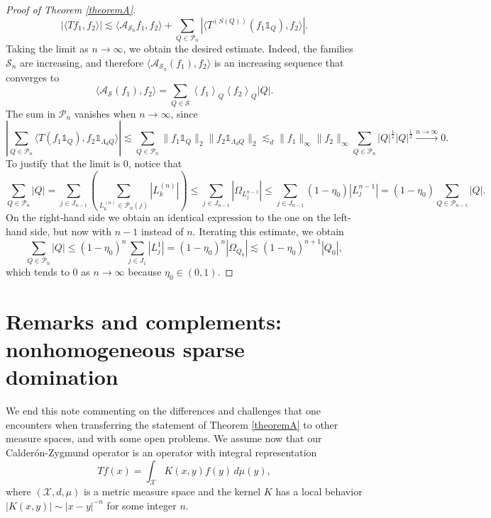 \documentclass[12pt]{amsart}
\newcommand{\one}{\mathds{1}}
\newcommand{\Ss}{\mathcal{S}}
\theoremstyle{plain}
\theoremstyle{definition} %
\numberwithin{equation}{section}
\begin{document}
\begin{proof}[Proof of Theorem \ref{theoremA}]
    \[
    |\langle Tf_1,f_2\rangle|
    \lesssim 
    \langle \mathcal{A}_{\Ss_n}f_1,f_2\rangle 
    +
    \sum_{Q\in \mathcal{P}_n}|\langle T^{(S(Q))}(f_1\one_{Q}),f_2\rangle|.
    \]
    Taking the limit as $n\to\infty$, we obtain the desired estimate. Indeed, the families $\Ss_n$ are increasing, and therefore $\langle \mathcal{A}_{\Ss_n}(f_1),f_2\rangle$ is an increasing sequence that converges to 
    \[
    \langle \mathcal{A}_{\Ss}(f_1),f_2\rangle
    =
    \sum_{Q \in \Ss}\left\langle f_1\right\rangle_Q\left\langle f_2\right\rangle_Q|Q|.
    \]
    The sum in $\mathcal{P}_n$ vanishes when $n\to\infty$, since%
    \[
    \left|\sum_{Q\in\mathcal{P}_n}\langle T(f_1\one_Q),f_2\one_{\Lambda_d Q}\rangle \right|
    \lesssim %
    \sum_{Q\in\mathcal{P}_n}\|f_1\one_{Q}\|_2\|f_2\one_{\Lambda_d Q}\|_{2}
    \lesssim_{d}
    \|f_1\|_{\infty}\|f_2\|_{\infty}\sum_{Q\in\mathcal{P}_n}|Q|^{\frac{1}{2}}|Q|^{\frac{1}{2}}
    \xrightarrow{n\to\infty}
    0.
    \]
    To justify that the limit is $0$, notice that
    \[
    \sum_{Q\in\mathcal{P}_n}|Q|
    =
    \sum_{j\in J_{n-1}}
    \left(
    \sum_{L_{k}^{(n)}\in \mathcal{P}_n(j)}
    |L_k^{(n)}|
    \right)
    \leq %
    \sum_{j\in J_{n-1}}
    |\Omega_{L_j^{n-1}}|
    \leq 
    \sum_{j\in J_{n-1}}(1-\eta_0)|L_j^{n-1}|
    =
    (1-\eta_0)\sum_{Q\in\mathcal{P}_{n-1}}|Q|.
    \]
    On the right-hand side we obtain an identical expression to the one on the left-hand side, but now with $n-1$ instead of $n$. Iterating this estimate, we obtain
    \[
    \sum_{Q\in\mathcal{P}_n}|Q|
    \leq 
    (1-\eta_0)^n\sum_{j\in J_1}|L_j^{1}|
    =
    (1-\eta_0)^n|\Omega_{Q_0}|
    \lesssim
    (1-\eta_0)^{n+1}|Q_0|,
    \]
    which tends to $0$ as $n\to\infty$ because $\eta_0\in (0,1)$.  \qedhere    
\end{proof}

\section{Remarks and complements: nonhomogeneous sparse domination} \label{sec:sec3}

We end this note commenting on the differences and challenges that one encounters when transferring the statement of Theorem \ref{theoremA} to other measure spaces, and with some open problems. We assume now that our Calder\'on-Zygmund operator is an operator with integral representation
$$
Tf(x) = \int_{\mathcal{X}} K(x,y) f(y) \, d\mu(y),
$$
where $(\mathcal{X},d,\mu)$ is a metric measure space and the kernel $K$ has a local behavior $|K(x,y)| \sim |x-y|^{-n}$ for some integer $n$. 
\end{document}
